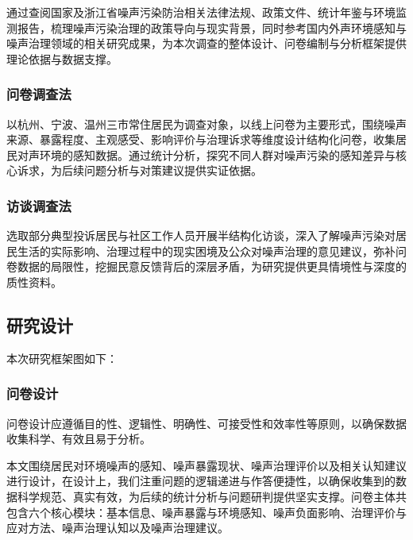 通过查阅国家及浙江省噪声污染防治相关法律法规、政策文件、统计年鉴与环境监测报告，梳理噪声污染治理的政策导向与现实背景，同时参考国内外声环境感知与噪声治理领域的相关研究成果，为本次调查的整体设计、问卷编制与分析框架提供理论依据与数据支撑。

\subsubsection{问卷调查法}

以杭州、宁波、温州三市常住居民为调查对象，以线上问卷为主要形式，围绕噪声来源、暴露程度、主观感受、影响评价与治理诉求等维度设计结构化问卷，收集居民对声环境的感知数据。通过统计分析，探究不同人群对噪声污染的感知差异与核心诉求，为后续问题分析与对策建议提供实证依据。

\subsubsection{访谈调查法}

选取部分典型投诉居民与社区工作人员开展半结构化访谈，深入了解噪声污染对居民生活的实际影响、治理过程中的现实困境及公众对噪声治理的意见建议，弥补问卷数据的局限性，挖掘民意反馈背后的深层矛盾，为研究提供更具情境性与深度的质性资料。

\subsection{研究设计}

本次研究框架图如下：


\subsubsection{问卷设计}

问卷设计应遵循目的性、逻辑性、明确性、可接受性和效率性等原则，以确保数据收集科学、有效且易于分析。

本文围绕居民对环境噪声的感知、噪声暴露现状、噪声治理评价以及相关认知建议进行设计，在设计上，我们注重问题的逻辑递进与作答便捷性，以确保收集到的数据科学规范、真实有效，为后续的统计分析与问题研判提供坚实支撑。问卷主体共包含六个核心模块：基本信息、噪声暴露与环境感知、噪声负面影响、治理评价与应对方法、噪声治理认知以及噪声治理建议。

